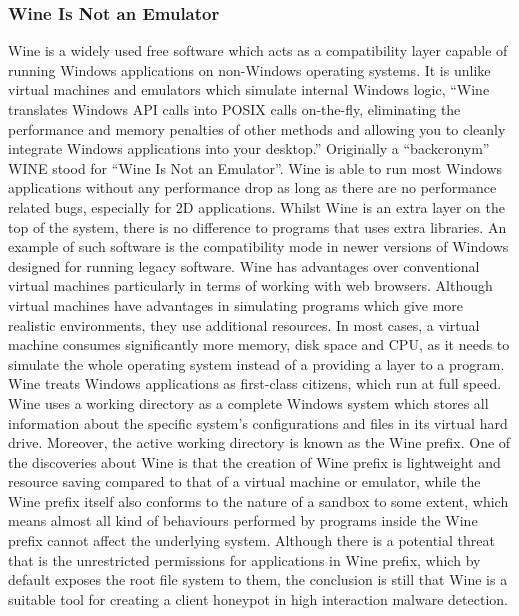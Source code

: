 \subsubsection{Wine Is Not an Emulator}
Wine is a widely used free software which acts as a compatibility layer 
capable of running Windows applications on non-Windows operating 
systems.\cite{wikiwine} It is unlike virtual machines and emulators which simulate 
internal Windows logic, ``Wine translates Windows API calls into POSIX calls 
on-the-fly, eliminating the performance and memory penalties of other methods 
and allowing you to cleanly integrate Windows applications into your 
desktop.''\cite{aboutwine} Originally a ``backcronym'' WINE stood for ``Wine Is Not an 
Emulator''. Wine is able to run most Windows applications 
without any performance drop as long as there are no performance related bugs, 
especially for 2D applications. Whilst Wine is an 
extra layer on the top of the system, there is no difference to programs that 
uses extra libraries. An example of such software is the compatibility 
mode in newer versions of Windows designed for running legacy 
software.\cite{wineperformance}
Wine has advantages over conventional virtual machines particularly in terms 
of working with web browsers. Although 
virtual machines have advantages in simulating programs which give more 
realistic environments, they use additional resources. In most cases, a virtual machine consumes significantly more memory, disk space and 
CPU, as it needs to simulate the whole operating system instead of a providing a layer to a program. Wine treats Windows applications as first-class 
citizens, which run at full speed.\cite{wineperformance}
Wine uses a working directory as a complete Windows system which stores all 
information about the specific system's configurations and files in its virtual 
hard drive. Moreover, the active working directory is known as the Wine prefix. 
One of the discoveries about Wine is that the creation of Wine prefix is 
lightweight and resource saving compared to that of a virtual machine or
emulator, while the Wine prefix itself also conforms to the nature of a 
sandbox to some extent, which means almost all kind of behaviours performed 
by programs inside the Wine prefix cannot affect the underlying system. 
Although there is a potential threat that is the unrestricted permissions 
for applications in Wine prefix, which by default exposes the root file 
system to them, the conclusion is still that Wine is a suitable tool for creating a 
client honeypot in high interaction malware detection. 

